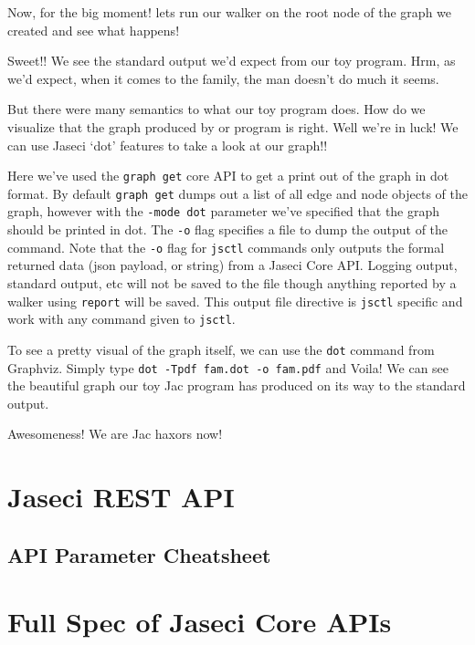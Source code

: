 \par
Now, for the big moment! lets run our walker on the root node of the graph we created and see what happens!
\par
{}
\par
Sweet!! We see the standard output we'd expect from our toy program. Hrm, as we'd expect, when it comes to the family, the man doesn't do much it seems.
\par
But there were many semantics to what our toy program does. How do we visualize that the graph produced by or program is right. Well we're in luck! We can use Jaseci `dot' features to take a look at our graph!!
\par
{}
\par
{}
Here we've used the \texttt{graph get} core API to get a print out of the graph in dot format. By default \texttt{graph get} dumps out a list of all edge and node objects of the graph, however with the \texttt{-mode dot} parameter we've specified that the graph should be printed in dot. The \texttt{-o} flag specifies a file to dump the output of the command. Note that the \texttt{-o} flag for \texttt{jsctl} commands only outputs the formal returned data (json payload, or string) from a Jaseci Core API. Logging output, standard output, etc will not be saved to the file though anything reported by a walker using \texttt{report} will be saved. This output file directive is \texttt{jsctl} specific and work with any command given to \texttt{jsctl}.
\par
To see a pretty visual of the graph itself, we can use the \texttt{dot} command from Graphviz. Simply type \texttt{dot -Tpdf fam.dot -o fam.pdf} and Voila! We can see the beautiful graph our toy Jac program has produced on its way to the standard output.
\par
Awesomeness! We are Jac \Gls{haxor}s now!

\section{Jaseci REST API}
\subsection{API Parameter Cheatsheet}
\printtabJSAPI
\section{Full Spec of Jaseci Core APIs}



